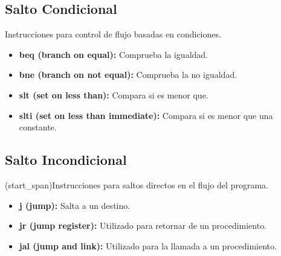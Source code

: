\documentclass{article}
\begin{document}
\subsection*{Salto Condicional}
Instrucciones para control de flujo basadas en condiciones.
\begin{itemize}
    \item \textbf{beq (branch on equal):} Comprueba la igualdad.
    \item \textbf{bne (branch on not equal):} Comprueba la no igualdad.
    \item \textbf{slt (set on less than):} Compara si es menor que.
    \item \textbf{slti (set on less than immediate):} Compara si es menor que una constante.
\end{itemize}

\subsection*{Salto Incondicional}
(start_span)Instrucciones para saltos directos en el flujo del programa.
\begin{itemize}
    \item \textbf{j (jump):} Salta a un destino.
    \item \textbf{jr (jump register):} Utilizado para retornar de un procedimiento.
    \item \textbf{jal (jump and link):} Utilizado para la llamada a un procedimiento.
\end{itemize}
\end{document}
